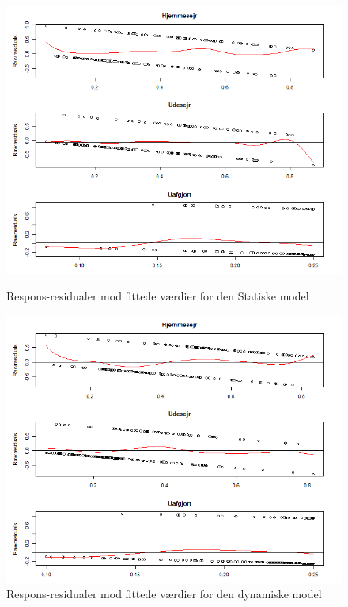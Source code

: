 \documentclass[11pt,a4paper]{article}
\begin{document}
\begin{figure}[ht]
  \centering
  \begin{minipage}[b]{0.5\textwidth}
    \includegraphics[width=\textwidth]{ResVsFitStat.png}
    \caption{Respons-residualer mod fittede værdier for den Statiske model}
  \end{minipage}
  \begin{minipage}[b]{0.5\textwidth}
    \includegraphics[width=\textwidth]{ResVsFitDyn.png}
    \caption{Respons-residualer mod fittede værdier for den dynamiske model}
  \end{minipage}
\end{figure}
\clearpage
\end{document}
